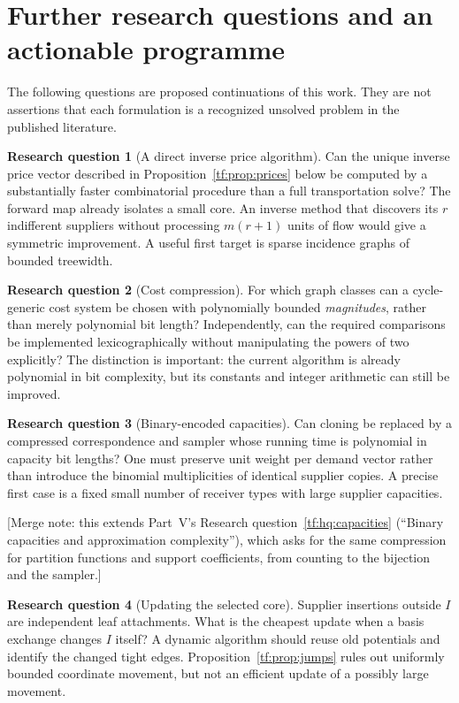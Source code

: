 \documentclass[11pt]{article}
\numberwithin{equation}{section}
\theoremstyle{definition}
\newtheorem{question}{Research question}%
\begin{document}
\section{Further research questions and an actionable programme}
\label{tf:sec:questions}
The following questions are proposed continuations of this work. They
are not assertions that each formulation is a recognized unsolved
problem in the published literature.

\begin{question}[A direct inverse price algorithm]\label{tf:q:prices}
Can the unique inverse price vector described in
Proposition~\ref{tf:prop:prices} below be computed by a substantially faster
combinatorial procedure than a full transportation solve? The forward
map already isolates a small core. An inverse method that discovers its
$r$ indifferent suppliers without processing $m(r+1)$ units of flow
would give a symmetric improvement. A useful first target is sparse
incidence graphs of bounded treewidth.
\end{question}

\begin{question}[Cost compression]\label{tf:q:compression}
For which graph classes can a cycle-generic cost system be chosen with
polynomially bounded \emph{magnitudes}, rather than merely polynomial bit
length? Independently, can the required comparisons be implemented
lexicographically without manipulating the powers of two explicitly?
The distinction is important: the current algorithm is already polynomial
in bit complexity, but its constants and integer arithmetic can still be
improved.
\end{question}

\begin{question}[Binary-encoded capacities]\label{tf:q:capacities}
Can cloning be replaced by a compressed correspondence and sampler whose
running time is polynomial in capacity bit lengths? One must preserve
unit weight per demand vector rather than introduce the binomial
multiplicities of identical supplier copies. A precise first case is a
fixed small number of receiver types with large supplier capacities.
\end{question}
[Merge note: this extends Part~V's Research
question~\ref{tf:hq:capacities} (``Binary capacities and approximation
complexity''), which asks for the same compression for partition
functions and support coefficients, from counting to the bijection and
the sampler.]

\begin{question}[Updating the selected core]\label{tf:q:core}
Supplier insertions outside $I$ are independent leaf attachments. What is
the cheapest update when a basis exchange changes $I$ itself? A dynamic
algorithm should reuse old potentials and identify the changed tight
edges. Proposition~\ref{tf:prop:jumps} rules out uniformly bounded coordinate
movement, but not an efficient update of a possibly large movement.
\end{question}
\end{document}
